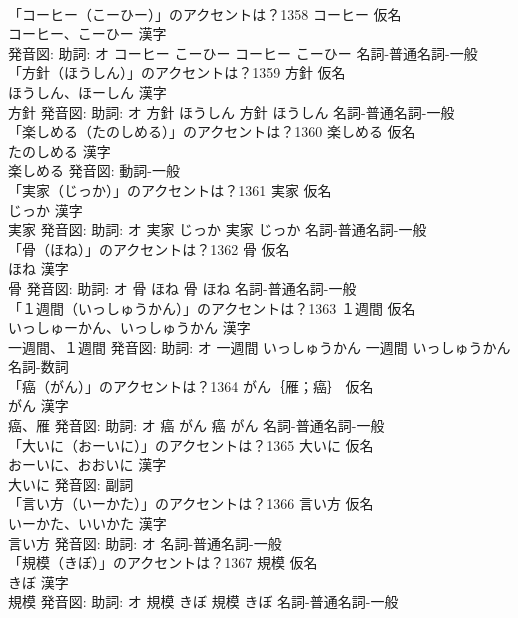 \documentclass[8pt]{extreport}
\begin{document}
\begin{CJK}{UTF8}{min}
\\	「コーヒー（こーひー）」のアクセントは？1358	コーヒー 仮名　
\\	コーヒー、こーひー 漢字　
\\	発音図: 助詞: オ	コーヒー こーひー		コーヒー こーひー				名詞-普通名詞-一般 
\\	「方針（ほうしん）」のアクセントは？1359	方針 仮名　
\\	ほうしん、ほーしん 漢字　
\\	方針 発音図: 助詞: オ	方針 ほうしん		方針 ほうしん				名詞-普通名詞-一般 
\\	「楽しめる（たのしめる）」のアクセントは？1360	楽しめる 仮名　
\\	たのしめる 漢字　
\\	楽しめる 発音図:							動詞-一般 
\\	「実家（じっか）」のアクセントは？1361	実家 仮名　
\\	じっか 漢字　
\\	実家 発音図: 助詞: オ	実家 じっか		実家 じっか				名詞-普通名詞-一般 
\\	「骨（ほね）」のアクセントは？1362	骨 仮名　
\\	ほね 漢字　
\\	骨 発音図: 助詞: オ	骨 ほね		骨 ほね				名詞-普通名詞-一般 
\\	「１週間（いっしゅうかん）」のアクセントは？1363	１週間 仮名　
\\	いっしゅーかん、いっしゅうかん 漢字　
\\	一週間、１週間 発音図: 助詞: オ	一週間 いっしゅうかん		一週間 いっしゅうかん				名詞-数詞 
\\	「癌（がん）」のアクセントは？1364	がん｛雁；癌｝ 仮名　
\\	がん 漢字　
\\	癌、雁 発音図: 助詞: オ	癌 がん		癌 がん				名詞-普通名詞-一般 
\\	「大いに（おーいに）」のアクセントは？1365	大いに 仮名　
\\	おーいに、おおいに 漢字　
\\	大いに 発音図:							副詞 
\\	「言い方（いーかた）」のアクセントは？1366	言い方 仮名　
\\	いーかた、いいかた 漢字　
\\	言い方 発音図: 助詞: オ							名詞-普通名詞-一般 
\\	「規模（きぼ）」のアクセントは？1367	規模 仮名　
\\	きぼ 漢字　
\\	規模 発音図: 助詞: オ	規模 きぼ		規模 きぼ				名詞-普通名詞-一般 

\end{CJK}
\end{document}
